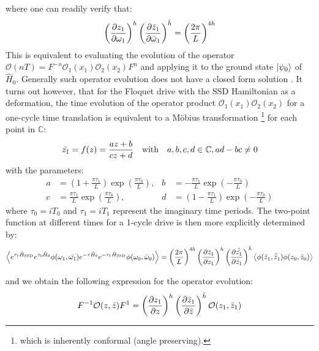 \documentclass[11pt, a4paper, oneside]{book}
\theoremstyle{definition} %
\begin{document}
where one can readily verify that:
\begin{equation}
	\left(\pdv{z_1}{\omega_1}\right)^h \left(\pdv{\bar{z}_1}{\bar{\omega}_1} \right)^{\bar{h}} = \left(\frac{2\pi}{L}\right)^{4h}
\end{equation}
This is equivalent to evaluating the evolution of the operator $\mathcal{O}(nT) = F^{-n} \mathcal{O}_1(x_1) \mathcal{O}_2(x_2) F^n$ and applying it to the ground state $\ket{\psi_0}$ of $\hat{H}_0$. Generally such operator evolution does not have a closed form solution \cite{Lapierre}. It turns out however, that for the Floquet drive with the SSD Hamiltonian as a deformation, the time evolution of the operator product $\mathcal{O}_1(x_1) \mathcal{O}_2(x_2)$ for a one-cycle time translation is equivalent to a Möbius transformation \footnote{which is inherently conformal (angle preserving).} for each point in $\mathbb{C}$:
\begin{equation}
	\tilde{z_1} = f(z) = \frac{az + b}{cz + d} \qq{with} a,b,c,d \in \mathbb{C}, ad - bc \neq 0
\end{equation}
with the parameters:
\begin{align*}
a &= \left( 1 + \frac{\pi \tau_1}{L}\right)\exp( \frac{\pi \tau_0}{L}), &  b &= - \frac{\pi \tau_1}{L} \exp(- \frac{\pi \tau_0}{L}) \\
c & = \frac{\pi \tau_1}{L}\exp(\frac{\pi \tau_0}{L}), & d &= \left( 1 - \frac{\pi \tau_1}{L} \right)\exp(- \frac{\pi \tau_0}{L})
\end{align*}
where $\tau_0 = i T_0$ and $\tau_1 = iT_1$ represent the imaginary time periods. The two-point function at different times for a 1-cycle drive is then more explicitly determined by:
\begin{equation}
	\expval{e^{\tau_1 \hat{H}_{\text{SSD}}} e^{\tau_0 \hat{H}_0} \phi(\omega_1, \bar{\omega_1}) e^{-\tau \hat{H}_0} e^{-\tau_1 \hat{H}_{\text{SSD}}} \phi(\omega_0, \bar{\omega}_0)} = \left(\frac{2\pi}{L}\right)^{4h} \left(\pdv{\tilde{z}_1}{z_1}\right)^h \left(\pdv{\tilde{\bar{z_1}}}{\bar{z}_1}\right)^{\bar{h}} \expval{\phi(\tilde{z}_1, \tilde{\bar{z}}_1) \phi(z_0, \bar{z}_0)}
\end{equation}



and we obtain the following expression for the operator evolution:
\begin{equation}
	F^{-1} \mathcal{O}(z, \bar{z}) F^1 = \left( \pdv{z_1}{z} \right)^h \left( \pdv{\bar{z}_1}{\bar{z}} \right)^{\bar{h}} \mathcal{O}(z_1, \bar{z}_1)
\end{equation}
\end{document}
